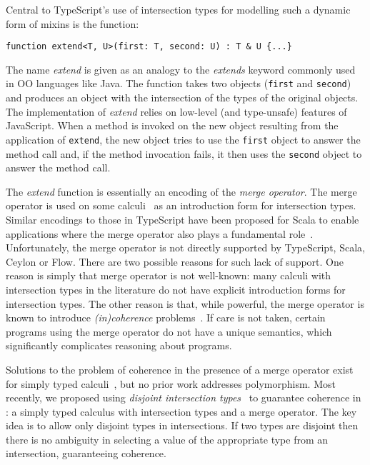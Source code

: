 Central to TypeScript's use of intersection types for modelling such a
dynamic form of mixins is the function:

\begin{lstlisting}
function extend<T, U>(first: T, second: U) : T & U {...}
\end{lstlisting}

\noindent The name \emph{extend} is given as an analogy to the
\emph{extends} keyword commonly used in OO languages like Java.
The function takes two objects (\lstinline{first} and
\lstinline{second}) and produces an object with the intersection of
the types of the original objects. The implementation of
\emph{extend} relies on low-level (and type-unsafe) features of 
JavaScript. When a method is invoked on the new object resulting from 
the application of \lstinline{extend}, the new object tries to use the 
\lstinline{first} object to answer the method call and, if the method
invocation fails, it then uses the \lstinline{second} object to answer
the method call. 

The \emph{extend} function is essentially an encoding of the
\emph{merge operator}. The merge operator is used on some
calculi~\cite{reynolds1997design,reynolds1991coherence,castagna1995calculus,dunfield2014elaborating,oliveira16disjoint} as
an introduction form for intersection types. Similar encodings to
those in TypeScript have been proposed for Scala to enable
applications where the merge operator also plays a fundamental
role~\cite{oliveira2013feature,Rendel14OA}. 
Unfortunately, the merge operator is not directly
supported by TypeScript, Scala, Ceylon or Flow. There are two possible
reasons for such lack of support. One reason is simply that merge operator is
not well-known: many calculi with intersection types in the literature
do not have explicit introduction forms for intersection types. The
other reason is that, while powerful, the merge operator is known
to introduce \emph{(in)coherence} problems~\cite{reynolds1991coherence,dunfield2014elaborating}.  
If care is not
taken, certain programs using the merge operator do not have a unique
semantics, which significantly complicates reasoning about programs.

Solutions to the problem of coherence in the presence 
of a merge operator exist for simply typed
calculi~\cite{reynolds1997design,reynolds1991coherence,castagna1995calculus,oliveira16disjoint}, 
but no prior work addresses polymorphism. Most recently, we
proposed using \emph{disjoint intersection types}~\cite{oliveira16disjoint} to 
guarantee coherence in \oldname: a simply typed calculus with intersection types and a merge 
operator. The key idea is to allow only disjoint types in
intersections. If two types are disjoint then there is no ambiguity in
selecting a value of the appropriate type from an intersection, 
guaranteeing coherence.

